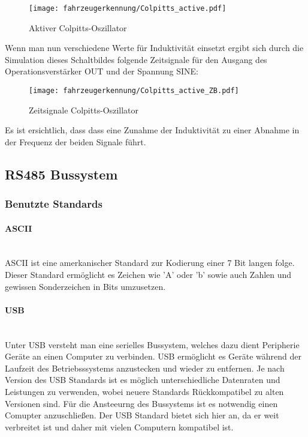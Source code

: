\begin{figure}[H]
    \centering
    \texttt{[image: fahrzeugerkennung/Colpitts\_active.pdf]}
    \caption{Aktiver Colpitts-Oszillator}
\end{figure}

Wenn man nun verschiedene Werte für Induktivität einsetzt ergibt sich durch die Simulation dieses Schaltbildes folgende Zeitsignale für den Ausgang des Operationsverstärker OUT und der Spannung SINE:

\begin{figure}[H]
    \centering
    \texttt{[image: fahrzeugerkennung/Colpitts\_active\_ZB.pdf]}
    \caption{Zeitsignale Colpitts-Oszillator}
\end{figure}

Es ist ersichtlich, dass dass eine Zunahme der Induktivität zu einer Abnahme in der Frequenz der beiden Signale führt.
\pagebreak
\subsection{RS485 Bussystem}
\subsubsection{Benutzte Standards}
\paragraph{ASCII}\mbox{}\\
ASCII ist eine amerkanischer Standard zur Kodierung einer 7 Bit langen folge. Dieser Standard ermöglicht es Zeichen wie 'A' oder 'b' sowie auch Zahlen und gewissen Sonderzeichen in Bits umzusetzen. 
\paragraph{USB}\mbox{}\\

Unter USB versteht man eine serielles Bussystem, welches dazu dient Peripherie Geräte an einen Computer zu verbinden. USB ermöglicht es Geräte während der Laufzeit des Betriebsssystems anzustecken und wieder zu entfernen.
Je nach Version des USB Standards ist es möglich unterschiedliche Datenraten und Leistungen zu verwenden, wobei neuere Standards Rückkompatibel zu alten Versionen sind. Für die Ansteeurng des Bussystems ist es notwendig einen Comupter anzuschließen. 
Der USB Standard bietet sich hier an, da er weit verbreitet ist und daher mit vielen Computern kompatibel ist.


